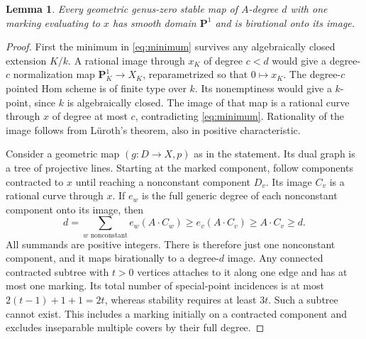 \documentclass[11pt]{article}
\newtheorem{lemma}[theorem]{Lemma}
\newcommand{\PP}{\mathbf P}
\begin{document}
\begin{lemma}\label{lem:boundary}
Every geometric genus-zero stable map of $A$-degree $d$ with one marking
evaluating to $x$ has smooth domain $\PP^1$ and is birational onto its image.
\end{lemma}
\begin{proof}
First the minimum in \eqref{eq:minimum} survives any algebraically closed
extension $K/k$. A rational image through $x_K$ of degree $c<d$ would give
a degree-$c$ normalization map $\PP^1_K\to X_K$, reparametrized so that
$0\mapsto x_K$. The degree-$c$ pointed Hom scheme is of finite type over
$k$. Its nonemptiness would give a $k$-point, since $k$ is algebraically
closed. The image of that map is a rational curve through $x$ of degree
at most $c$, contradicting \eqref{eq:minimum}. Rationality of the image
follows from L\"uroth's theorem, also in positive characteristic.

Consider a geometric map $(g:D\to X,p)$ as in the statement. Its dual
graph is a tree of projective lines. Starting at the marked component,
follow components contracted to $x$ until reaching a nonconstant component
$D_v$. Its image $C_v$ is a rational curve through $x$. If $e_w$ is the
full generic degree of each nonconstant component onto its image, then
\[
d=\sum_{w\text{ nonconstant}} e_w(A\cdot C_w)
 \geq e_v(A\cdot C_v)\geq A\cdot C_v\geq d.
\]
All summands are positive integers. There is therefore just one
nonconstant component, and it maps birationally to a degree-$d$ image.
Any connected contracted subtree with $t>0$ vertices attaches to it along
one edge and has at most one marking. Its total number of special-point
incidences is at most $2(t-1)+1+1=2t$, whereas stability requires at least
$3t$. Such a subtree cannot exist. This includes a marking initially on
a contracted component and excludes inseparable multiple covers by their
full degree.
\end{proof}
\end{document}
